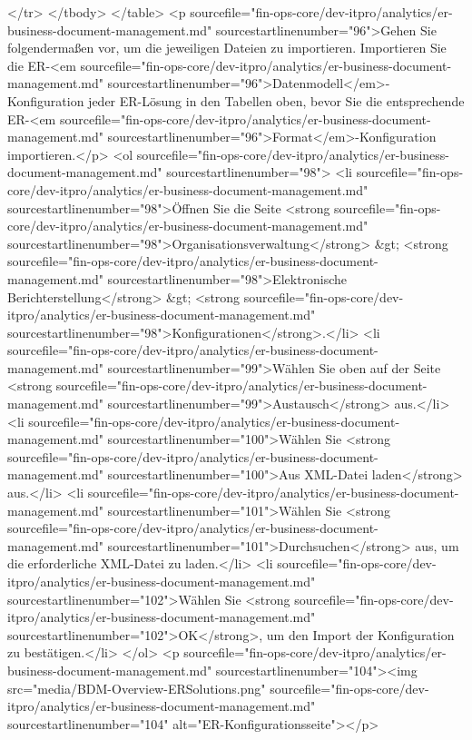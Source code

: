 </tr>
</tbody>
</table>
<p sourcefile="fin-ops-core/dev-itpro/analytics/er-business-document-management.md" sourcestartlinenumber="96">Gehen Sie folgendermaßen vor, um die jeweiligen Dateien zu importieren. Importieren Sie die ER-<em sourcefile="fin-ops-core/dev-itpro/analytics/er-business-document-management.md" sourcestartlinenumber="96">Datenmodell</em>-Konfiguration jeder ER-Lösung in den Tabellen oben, bevor Sie die entsprechende ER-<em sourcefile="fin-ops-core/dev-itpro/analytics/er-business-document-management.md" sourcestartlinenumber="96">Format</em>-Konfiguration importieren.</p>
<ol sourcefile="fin-ops-core/dev-itpro/analytics/er-business-document-management.md" sourcestartlinenumber="98">
<li sourcefile="fin-ops-core/dev-itpro/analytics/er-business-document-management.md" sourcestartlinenumber="98">Öffnen Sie die Seite <strong sourcefile="fin-ops-core/dev-itpro/analytics/er-business-document-management.md" sourcestartlinenumber="98">Organisationsverwaltung</strong> &gt; <strong sourcefile="fin-ops-core/dev-itpro/analytics/er-business-document-management.md" sourcestartlinenumber="98">Elektronische Berichterstellung</strong> &gt; <strong sourcefile="fin-ops-core/dev-itpro/analytics/er-business-document-management.md" sourcestartlinenumber="98">Konfigurationen</strong>.</li>
<li sourcefile="fin-ops-core/dev-itpro/analytics/er-business-document-management.md" sourcestartlinenumber="99">Wählen Sie oben auf der Seite <strong sourcefile="fin-ops-core/dev-itpro/analytics/er-business-document-management.md" sourcestartlinenumber="99">Austausch</strong> aus.</li>
<li sourcefile="fin-ops-core/dev-itpro/analytics/er-business-document-management.md" sourcestartlinenumber="100">Wählen Sie <strong sourcefile="fin-ops-core/dev-itpro/analytics/er-business-document-management.md" sourcestartlinenumber="100">Aus XML-Datei laden</strong> aus.</li>
<li sourcefile="fin-ops-core/dev-itpro/analytics/er-business-document-management.md" sourcestartlinenumber="101">Wählen Sie <strong sourcefile="fin-ops-core/dev-itpro/analytics/er-business-document-management.md" sourcestartlinenumber="101">Durchsuchen</strong> aus, um die erforderliche XML-Datei zu laden.</li>
<li sourcefile="fin-ops-core/dev-itpro/analytics/er-business-document-management.md" sourcestartlinenumber="102">Wählen Sie <strong sourcefile="fin-ops-core/dev-itpro/analytics/er-business-document-management.md" sourcestartlinenumber="102">OK</strong>, um den Import der Konfiguration zu bestätigen.</li>
</ol>
<p sourcefile="fin-ops-core/dev-itpro/analytics/er-business-document-management.md" sourcestartlinenumber="104"><img src="media/BDM-Overview-ERSolutions.png" sourcefile="fin-ops-core/dev-itpro/analytics/er-business-document-management.md" sourcestartlinenumber="104" alt="ER-Konfigurationsseite"></p>
